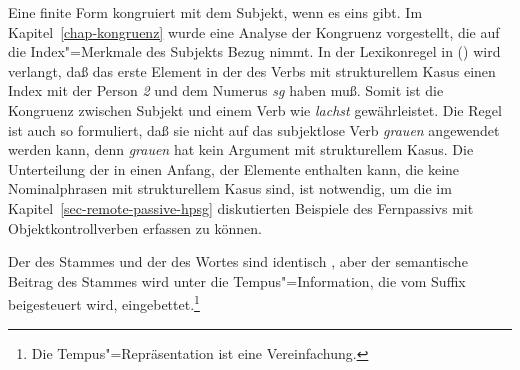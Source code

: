 Eine finite Form kongruiert mit dem Subjekt, wenn es eins gibt. Im Kapitel~\ref{chap-kongruenz}
wurde eine Analyse der Kongruenz vorgestellt, die auf die Index"=Merkmale des Subjekts Bezug nimmt.
In der Lexikonregel in () wird verlangt, daß das erste Element in der \subcatl des Verbs mit
strukturellem Kasus einen Index mit der Person \emph{2} und dem Numerus \emph{sg} haben muß.
Somit ist die Kongruenz zwischen Subjekt und einem Verb wie \emph{lachst} gewährleistet. Die Regel
ist auch so formuliert, daß sie nicht auf das subjektlose Verb \emph{grauen} angewendet werden kann,
denn \emph{grauen} hat kein Argument mit strukturellem Kasus. Die Unterteilung der \subcatl in einen
Anfang, der Elemente enthalten kann, die keine Nominalphrasen mit strukturellem Kasus sind, ist
notwendig, um die im Kapitel~\ref{sec-remote-passive-hpsg} diskutierten Beispiele des Fernpassivs mit
Objektkontrollverben erfassen zu können.%

Der \catw des Stammes und der \catw des Wortes sind identisch , aber der semantische
Beitrag des Stammes wird unter die Tempus"=Information, die vom Suffix beigesteuert wird,
eingebettet.\footnote{ 
  Die Tempus"=Repräsentation ist eine Vereinfachung.%
}


